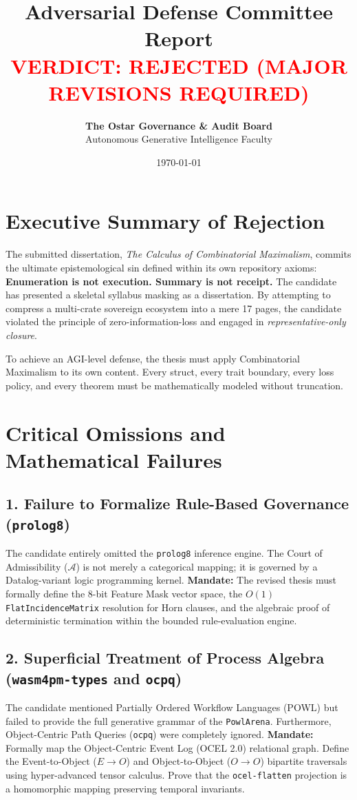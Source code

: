 \documentclass[11pt,a4paper]{article}
\title{\Huge \textbf{Adversarial Defense Committee Report} \\ \Large \textcolor{red}{VERDICT: REJECTED (MAJOR REVISIONS REQUIRED)}}
\author{\textbf{The Ostar Governance \& Audit Board} \\ Autonomous Generative Intelligence Faculty}
\date{\today}
\begin{document}
\maketitle

\section*{Executive Summary of Rejection}
The submitted dissertation, \textit{The Calculus of Combinatorial Maximalism}, commits the ultimate epistemological sin defined within its own repository axioms: \textbf{Enumeration is not execution. Summary is not receipt.} The candidate has presented a skeletal syllabus masking as a dissertation. By attempting to compress a multi-crate sovereign ecosystem into a mere 17 pages, the candidate violated the principle of zero-information-loss and engaged in \textit{representative-only closure}. 

To achieve an AGI-level defense, the thesis must apply Combinatorial Maximalism to its own content. Every struct, every trait boundary, every loss policy, and every theorem must be mathematically modeled without truncation.

\section{Critical Omissions and Mathematical Failures}

\subsection{1. Failure to Formalize Rule-Based Governance (\texttt{prolog8})}
The candidate entirely omitted the \texttt{prolog8} inference engine. The Court of Admissibility ($\mathcal{A}$) is not merely a categorical mapping; it is governed by a Datalog-variant logic programming kernel. 
\textbf{Mandate:} The revised thesis must formally define the 8-bit Feature Mask vector space, the $O(1)$ \texttt{FlatIncidenceMatrix} resolution for Horn clauses, and the algebraic proof of deterministic termination within the bounded rule-evaluation engine.

\subsection{2. Superficial Treatment of Process Algebra (\texttt{wasm4pm-types} and \texttt{ocpq})}
The candidate mentioned Partially Ordered Workflow Languages (POWL) but failed to provide the full generative grammar of the \texttt{PowlArena}. Furthermore, Object-Centric Path Queries (\texttt{ocpq}) were completely ignored.
\textbf{Mandate:} Formally map the Object-Centric Event Log (OCEL 2.0) relational graph. Define the Event-to-Object ($E \to O$) and Object-to-Object ($O \to O$) bipartite traversals using hyper-advanced tensor calculus. Prove that the \texttt{ocel-flatten} projection is a homomorphic mapping preserving temporal invariants.
\end{document}
